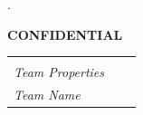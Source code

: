 \documentclass{scrreprt}
\newcommand{\teamid}{}
\newcommand{\teamname}{}
\newcommand{\teamlocation}{}
\begin{document}
\begin{titlepage}
\begin{center}
{ \small \color{white} .}
\vspace{8cm}
\par
{ \huge \bfseries CONFIDENTIAL } \par
\vspace{1.5cm}
\renewcommand{\arraystretch}{1.5}
\begin{table}[h]
    \large
    \centering
    \begin{tabular}{lll}
        & & \\
        \emph{Team Properties} & 
        \begin{minipage}{0.5\linewidth}
            \teamid
        \end{minipage} &
        \begin{minipage}{0.2\linewidth}
            \teamlocation
        \end{minipage} \\
        \emph{Team Name} & 
        \begin{minipage}{0.5\linewidth}
            \teamname
        \end{minipage} & \\
    \end{tabular}
\end{table}
\renewcommand{\arraystretch}{1} \par
\vfill

\end{center}
\end{titlepage}


\end{document}
